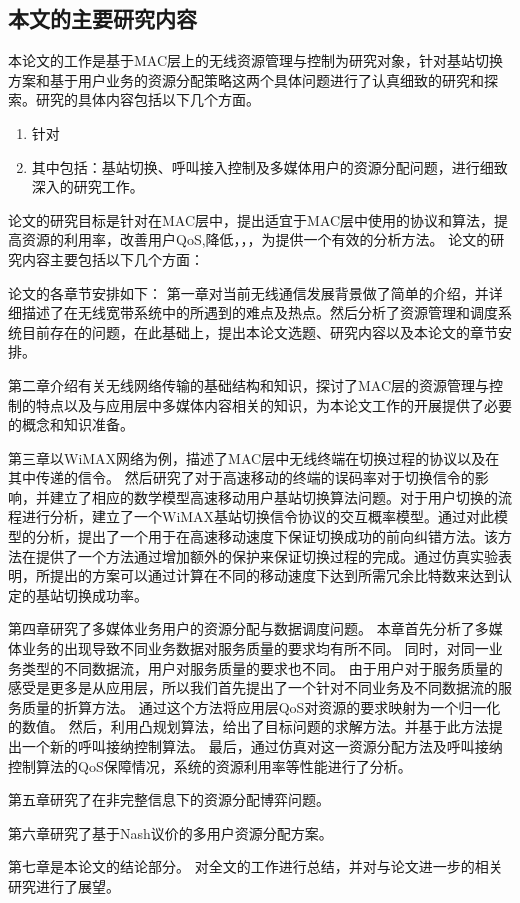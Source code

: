 \subsection{本文的主要研究内容}
本论文的工作是基于MAC层上的无线资源管理与控制为研究对象，针对基站切换方案和基于用户业务的资源分配策略这两个具体问题进行了认真细致的研究和探索。研究的具体内容包括以下几个方面。
\begin{enumerate}[(1.)]
\item 针对
\item 其中包括：基站切换、呼叫接入控制及多媒体用户的资源分配问题，进行细致深入的研究工作。
\end{enumerate}
论文的研究目标是针对在MAC层中，提出适宜于MAC层中使用的协议和算法，提高资源的利用率，改善用户QoS,降低，，，为提供一个有效的分析方法。
论文的研究内容主要包括以下几个方面：

论文的各章节安排如下：
第一章对当前无线通信发展背景做了简单的介绍，并详细描述了在无线宽带系统中的所遇到的难点及热点。然后分析了资源管理和调度系统目前存在的问题，在此基础上，提出本论文选题、研究内容以及本论文的章节安排。
\par 第二章介绍有关无线网络传输的基础结构和知识，探讨了MAC层的资源管理与控制的特点以及与应用层中多媒体内容相关的知识，为本论文工作的开展提供了必要的概念和知识准备。
\par 第三章以WiMAX网络为例，描述了MAC层中无线终端在切换过程的协议以及在其中传递的信令。
然后研究了对于高速移动的终端的误码率对于切换信令的影响，并建立了相应的数学模型高速移动用户基站切换算法问题。对于用户切换的流程进行分析，建立了一个WiMAX基站切换信令协议的交互概率模型。通过对此模型的分析，提出了一个用于在高速移动速度下保证切换成功的前向纠错方法。该方法在提供了一个方法通过增加额外的保护来保证切换过程的完成。通过仿真实验表明，所提出的方案可以通过计算在不同的移动速度下达到所需冗余比特数来达到认定的基站切换成功率。
\par 第四章研究了多媒体业务用户的资源分配与数据调度问题。
本章首先分析了多媒体业务的出现导致不同业务数据对服务质量的要求均有所不同。
同时，对同一业务类型的不同数据流，用户对服务质量的要求也不同。
由于用户对于服务质量的感受是更多是从应用层，所以我们首先提出了一个针对不同业务及不同数据流的服务质量的折算方法。
通过这个方法将应用层QoS对资源的要求映射为一个归一化的数值。
然后，利用凸规划算法，给出了目标问题的求解方法。并基于此方法提出一个新的呼叫接纳控制算法。
最后，通过仿真对这一资源分配方法及呼叫接纳控制算法的QoS保障情况，系统的资源利用率等性能进行了分析。
\par 第五章研究了在非完整信息下的资源分配博弈问题。
\par 第六章研究了基于Nash议价的多用户资源分配方案。
\par 第七章是本论文的结论部分。
对全文的工作进行总结，并对与论文进一步的相关研究进行了展望。
